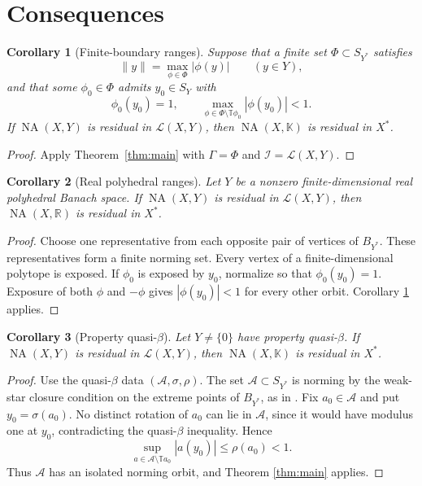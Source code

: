 \documentclass[11pt]{article}
\newtheorem{corollary}{Corollary}
\newcommand{\K}{\mathbb K}
\newcommand{\T}{\mathbb T}
\newcommand{\NA}{\operatorname{NA}}
\newcommand{\calL}{\mathcal L}
\newcommand{\norm}[1]{\lVert #1\rVert}
\begin{document}
\section*{Consequences}

\begin{corollary}[Finite-boundary ranges]\label{cor:finiteboundary}
Suppose that a finite set \(\Phi\subset S_{Y^*}\) satisfies
\[
 \norm y=\max_{\phi\in\Phi}|\phi(y)|\qquad(y\in Y),
\]
and that some \(\phi_0\in\Phi\) admits \(y_0\in S_Y\) with
\[
 \phi_0(y_0)=1,\qquad
 \max_{\phi\in\Phi\setminus\T\phi_0}|\phi(y_0)|<1.
\]
If \(\NA(X,Y)\) is residual in \(\calL(X,Y)\), then \(\NA(X,\K)\) is residual
in \(X^*\).
\end{corollary}

\begin{proof}
Apply Theorem~\ref{thm:main} with \(\Gamma=\Phi\) and
\(\mathcal I=\calL(X,Y)\).
\end{proof}

\begin{corollary}[Real polyhedral ranges]
Let \(Y\) be a nonzero finite-dimensional real polyhedral Banach space.  If
\(\NA(X,Y)\) is residual in \(\calL(X,Y)\), then \(\NA(X,\mathbb R)\) is
residual in \(X^*\).
\end{corollary}

\begin{proof}
Choose one representative from each opposite pair of vertices of \(B_{Y^*}\).
These representatives form a finite norming set.  Every vertex of a
finite-dimensional polytope is exposed.  If \(\phi_0\) is exposed by \(y_0\),
normalize so that \(\phi_0(y_0)=1\).  Exposure of both \(\phi\) and \(-\phi\)
gives \(|\phi(y_0)|<1\) for every other orbit.  Corollary
\ref{cor:finiteboundary} applies.
\end{proof}

\begin{corollary}[Property quasi-\(\beta\)]
Let \(Y\neq\{0\}\) have property quasi-\(\beta\).  If \(\NA(X,Y)\) is residual
in \(\calL(X,Y)\), then \(\NA(X,\K)\) is residual in \(X^*\).
\end{corollary}

\begin{proof}
Use the quasi-\(\beta\) data \((\mathcal A,\sigma,\rho)\).  The set
\(\mathcal A\subset S_{Y^*}\) is norming by the weak-star closure condition on
the extreme points of \(B_{Y^*}\), as in \cite[Section 3.1]{JMRZ}.  Fix
\(a_0\in\mathcal A\) and put \(y_0=\sigma(a_0)\).  No distinct rotation of
\(a_0\) can lie in \(\mathcal A\), since it would have modulus one at \(y_0\),
contradicting the quasi-\(\beta\) inequality.  Hence
\[
 \sup_{a\in\mathcal A\setminus\T a_0}|a(y_0)|\le\rho(a_0)<1.
\]
Thus \(\mathcal A\) has an isolated norming orbit, and Theorem
\ref{thm:main} applies.
\end{proof}
\end{document}
